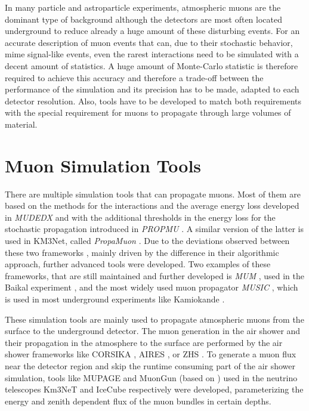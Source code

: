 In many particle and astroparticle experiments, atmospheric muons are the dominant type of background although the detectors are most often located underground to reduce already a huge amount of these disturbing events.
For an accurate description of muon events that can, due to their stochastic behavior, mime signal-like events, even the rarest interactions need to be simulated with a decent amount of statistics.
A huge amount of Monte-Carlo statistic is therefore required to achieve this accuracy and therefore a trade-off between the performance of the simulation and its precision has to be made, adapted to each detector resolution.
Also, tools have to be developed to match both requirements with the special requirement for muons to propagate through large volumes of material.

%

\section{Muon Simulation Tools}

There are multiple simulation tools that can propagate muons.
Most of them are based on the methods for the interactions and the average energy loss developed in \textit{MUDEDX} \cite{Lohmann85} and with the additional thresholds in the energy loss for the stochastic propagation introduced in \textit{PROPMU} \cite{Lipari91}.
A similar version of the latter is used in KM3Net, called \textit{PropaMuon} \cite{Km3Net2020gSeaGen}.
Due to the deviations observed between these two frameworks \cite{Desiati01ICRC}, mainly driven by the difference in their algorithmic approach, further advanced tools were developed.
Two examples of these frameworks, that are still maintained and further developed is \textit{MUM} \cite{Sokalski01MUM, Bugaev00MUM}, used in the Baikal experiment \cite{Baikal97}, and the most widely used muon propagator \textit{MUSIC} \cite{Antonioli97, Kudryavtseva99, Kudryavtsev09}, which is used in most underground experiments like Kamiokande \cite{HyperKamiokande18}.

These simulation tools are mainly used to propagate atmospheric muons from the surface to the underground detector.
The muon generation in the air shower and their propagation in the atmosphere to the surface are performed by the air shower frameworks like CORSIKA \cite{CORSIKA, Engel19}, AIRES \cite{Sciutto19AIRES}, or ZHS \cite{Zas92ZHS}.
To generate a muon flux near the detector region and skip the runtime consuming part of the air shower simulation, tools like MUPAGE \cite{Carminati09} and MuonGun (based on \cite{Becherini06}) used in the neutrino telescopes Km3NeT and IceCube respectively were developed, parameterizing the energy and zenith dependent flux of the muon bundles in certain depths.

